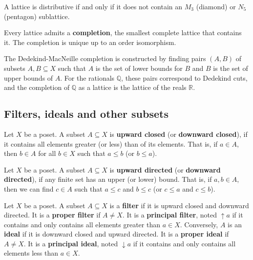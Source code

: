\documentclass{bareminimum}
\begin{document}
\begin{prop}
	A lattice is distributive if and only if it does not contain an $M_3$ (diamond) or $N_5$ (pentagon) sublattice.
\end{prop}

\begin{prop}
	Every lattice  admits a \textbf{completion}, the smallest complete lattice that contains it. The completion is unique up to an order isomorphism.
\end{prop}

\begin{remark}
	The Dedekind-MacNeille completion is constructed by finding pairs $(A, B)$ of subsets $A, B \subseteq X$ such that $A$ is the set of lower bounds for $B$ and $B$ is the set of upper bounds of $A$. For the rationals $\mathbb{Q}$, these pairs correspond to Dedekind cuts, and the completion of $\mathbb{Q}$ as a lattice is the lattice of the reals $\mathbb{R}$.
\end{remark}

\subsection{Filters, ideals and other subsets}

\begin{defn}
	Let $X$ be a poset.  A subset $A \subseteq X$ is \textbf{upward closed} (or \textbf{downward closed}), if it contains all elements greater (or less) than of its elements. That is, if $a \in A$, then $b \in A$ for all $b \in X$ such that $a \leq b$ (or $b \leq a$).
\end{defn}

\begin{defn}
	Let $X$ be a poset.  A subset $A \subseteq X$ is \textbf{upward directed} (or \textbf{downward directed}), if any finite set has an upper (or lower) bound. That is, if $a,b \in A$, then we can find $c \in A$ such that $a \leq c$ and $b \leq c$ (or $c \leq a$ and $c \leq b$).
\end{defn}

\begin{defn}
	Let $X$ be a poset.  A subset $A \subseteq X$ is a \textbf{filter} if it is upward closed and downward directed. It is a \textbf{proper filter} if $A \neq X$. It is a \textbf{principal filter}, noted $\uparrow a$ if it contains and only contains all elements greater than $a \in X$. Conversely, $A$ is an \textbf{ideal} if it is downward closed and upward directed. It is a \textbf{proper ideal} if $A \neq X$. It is a \textbf{principal ideal}, noted $\downarrow a$ if it contains and only contains all elements less than $a \in X$.
\end{defn}
\end{document}
